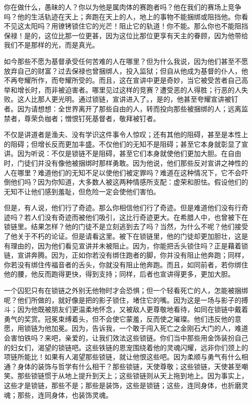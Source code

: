 你在做什么，愚昧的人？你以为他是属肉体的赛跑者吗？他在我们的赛场上竞争吗？他的生活轨迹在天上；奔跑在天上的人，地上的事物不能捆绑或阻挡他。你看不见这太阳吗？用镣铐锁住它的光芒！阻止它的轨道！你不能。那么你也不能阻挡保禄！是的，这位比那一位更甚，因为这位比那位更享有天主的眷顾，因为他带给我们不是那样的光，而是真光。\par

如今那些不愿为基督承受任何苦难的人在哪里？但为什么我说，因为他们甚至不愿放弃自己的财富？过去保禄也曾捆绑人，投入监狱；但自从他成为基督的仆人，他不再夸耀所作，而夸耀所受的。而且，这在宣讲中更是奇妙，当它被受苦者自己高举和增长时，而非被迫害者。哪里见过这样的竞赛？遭受恶的人得胜；行恶的人失败。这人比那人更光明。通过锁链，宣讲进入了。，是的，他甚至夸耀宣讲被钉者。因为请想想：全世界离开了那些自由的人，转而投向那些被捆绑的人；远离监禁者，尊荣负枷者；憎恨钉死基督者，敬拜被钉者。\par

不仅是讲道者是渔夫、没有学识这件事令人惊叹；还有其他的阻碍，甚至是本性上的阻碍；但增长反而更加丰盛。不仅他们的无知不是阻碍；甚至它本身就彰显了宣讲。因为听说：不仅是锁链不是阻碍，甚至它们本身就使他们更加大胆。在自由时，门徒们并没有像他被捆绑时那样勇敢。因为他说，他们那些反对宣讲之神性的人在哪里？难道他们的无知不足以使他们被定罪吗？难道在这种情况下，它不会吓倒他们吗？因为你知道，大多数人被这两种情感所支配：虚荣和胆怯。假设他们的无知不让他们感到羞耻，但危险一定会使他们害怕。\par

但是，有人说，他们行了奇迹。那么你相信他们行了奇迹。但是难道他们没有行奇迹吗？若人们没有奇迹而被他们吸引，这比行奇迹更大。在希腊人中，也曾被下在锁链里。结果怎样？他的门徒不是立刻逃到去了吗？当然，为什么不呢？他们接受了他关于不朽的论证。但是请看这里。被下在锁链里，他的门徒却更加胆壮，这是有理由的，因为他们看见宣讲并未被阻止。因为，你能把舌头锁住吗？正是藉着锁链，宣讲奔腾。因为，正如你若没有绑住跑者的脚，你并没有阻止他奔跑；同样，你若没有绑住传福音者的舌头，你就没有阻止他奔跑。而且，如同前者，若你绑住他的腰，他反而跑得更快，得到支持；同样，后者也宣讲得更多，更加大胆。\par

一个囚犯只有在锁链之外别无他物时才会恐惧；但一个轻看死亡的人，怎能被捆绑呢？他们所做的，就好像是把的影子锁住，堵住它的嘴。因为这是一场与影子的搏斗；因为他既被朋友们更温柔地怀念，又被敌人更尊敬地看待，如同在锁链中戴着勇气的奖赏。冠冕束缚着头，但不会使它蒙羞，反而使之璀璨。他们违反他的意愿，用锁链为他加冕。因为，告诉我，一个敢于闯入死亡之金刚石大门的人，难道会害怕铁吗？来吧，亲爱的，让我们效法这些锁链。你们当中那些用金饰装扮自己的妇女们，渴望的锁链吧。这些铁链的恩宠围绕着他的灵魂闪耀，远非你们颈上的项链所能比！如果有人渴望那些锁链，就让他恨这些吧。因为柔顺与勇气有什么相通？身体的装饰与哲学有什么相干？那些锁链，天使尊敬；这些锁链，天使甚至嘲笑。那些锁链惯于从地上提升到天上；这些锁链则从天上拖到地上。因为事实上，这些才是锁链，那些不是；那些是装饰，这些是锁链；这些，连同身体，也折磨灵魂；那些，连同身体，也装饰灵魂。\par

